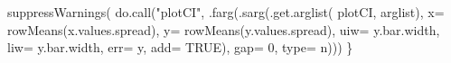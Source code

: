 \documentclass[
  letterpaper,
  DIV=11,
  numbers=noendperiod]{scrartcl}
\newenvironment{Shaded}{\begin{snugshade}}{\end{snugshade}}
\newcommand{\AttributeTok}[1]{\textcolor[rgb]{0.40,0.45,0.13}{#1}}
\newcommand{\ConstantTok}[1]{\textcolor[rgb]{0.56,0.35,0.01}{#1}}
\newcommand{\DecValTok}[1]{\textcolor[rgb]{0.68,0.00,0.00}{#1}}
\newcommand{\FunctionTok}[1]{\textcolor[rgb]{0.28,0.35,0.67}{#1}}
\newcommand{\NormalTok}[1]{\textcolor[rgb]{0.00,0.23,0.31}{#1}}
\newcommand{\StringTok}[1]{\textcolor[rgb]{0.13,0.47,0.30}{#1}}
\begin{document}
\begin{Shaded}
\begin{Highlighting}[]
        \FunctionTok{suppressWarnings}\NormalTok{( }\FunctionTok{do.call}\NormalTok{(}\StringTok{"plotCI"}\NormalTok{,}
                                  \FunctionTok{.farg}\NormalTok{(}\FunctionTok{.sarg}\NormalTok{(}\FunctionTok{.get.arglist}\NormalTok{( }\StringTok{\textquotesingle{}plotCI\textquotesingle{}}\NormalTok{, arglist),}
                                              \AttributeTok{x=} \FunctionTok{rowMeans}\NormalTok{(x.values.spread), }
                                              \AttributeTok{y=} \FunctionTok{rowMeans}\NormalTok{(y.values.spread),}
                                              \AttributeTok{uiw=}\NormalTok{ y.bar.width, }
                                              \AttributeTok{liw=}\NormalTok{ y.bar.width, }
                                              \AttributeTok{err=} \StringTok{\textquotesingle{}y\textquotesingle{}}\NormalTok{, }
                                              \AttributeTok{add=} \ConstantTok{TRUE}\NormalTok{),}
                                        \AttributeTok{gap=} \DecValTok{0}\NormalTok{,}
                                        \AttributeTok{type=} \StringTok{\textquotesingle{}n\textquotesingle{}}\NormalTok{)))}
\NormalTok{    \}}


\end{Highlighting}
\end{Shaded}
\end{document}
